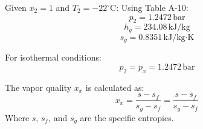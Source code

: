 Given \( x_2 = 1 \) and \( T_2 = -22^\circ\text{C} \):  
Using Table A-10:  
\[
p_2 = 1.2472 \, \text{bar}
\]  
\[
h_g = 234.08 \, \text{kJ/kg}
\]  
\[
s_g = 0.8351 \, \text{kJ/kg·K}
\]

For isothermal conditions:  
\[
p_2 = p_x = 1.2472 \, \text{bar}
\]

The vapor quality \( x_x \) is calculated as:  
\[
x_x = \frac{s - s_f}{s_g - s_f} = \frac{s - s_f}{s_g - s_f}
\]  
Where \( s \), \( s_f \), and \( s_g \) are the specific entropies.